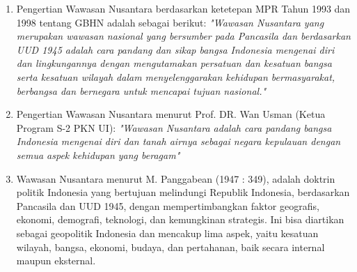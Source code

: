 \begin{enumerate}

  \item Pengertian Wawasan Nusantara berdasarkan ketetepan MPR Tahun 1993 dan 1998 tentang GBHN adalah sebagai berikut: \textit{"Wawasan Nusantara yang merupakan wawasan nasional yang bersumber pada Pancasila dan berdasarkan UUD 1945 adalah cara pandang dan sikap bangsa Indonesia mengenai diri dan lingkungannya dengan mengutamakan persatuan dan kesatuan bangsa serta kesatuan wilayah dalam menyelenggarakan kehidupan bermasyarakat, berbangsa dan bernegara untuk mencapai tujuan nasional."}
  
  \item Pengertian Wawasan Nusantara menurut Prof. DR. Wan Usman (Ketua Program S-2 PKN UI): \textit{"Wawasan Nusantara adalah cara pandang bangsa Indonesia mengenai diri dan tanah airnya sebagai negara kepulauan dengan semua aspek kehidupan yang beragam"}

  \item Wawasan Nusantara menurut M. Panggabean (1947 : 349), adalah doktrin politik Indonesia yang bertujuan melindungi Republik Indonesia, berdasarkan Pancasila dan UUD 1945, dengan mempertimbangkan faktor geografis, ekonomi, demografi, teknologi, dan kemungkinan strategis. Ini bisa diartikan sebagai geopolitik Indonesia dan mencakup lima aspek, yaitu kesatuan wilayah, bangsa, ekonomi, budaya, dan pertahanan, baik secara internal maupun eksternal.

  
\end{enumerate}
